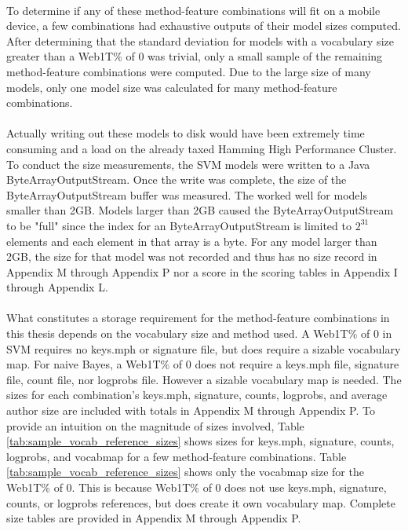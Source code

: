	\paragraph*{}To determine if any of these method-feature combinations will fit on a mobile device, a few combinations had exhaustive outputs of their model sizes computed.  After determining that the standard deviation for models with a vocabulary size greater than a Web1T\% of 0 was trivial, only a small sample of the remaining method-feature combinations were computed.  Due to the large size of many models, only one model size was calculated for many method-feature combinations.  
	\paragraph*{} Actually writing out these models to disk would have been extremely time consuming and a load on the already taxed Hamming High Performance Cluster.  To conduct the size measurements, the SVM models were written to a Java ByteArrayOutputStream.  Once the write was complete, the size of the ByteArrayOutputStream buffer was measured.  The worked well for models smaller than 2GB.  Models larger than 2GB caused the ByteArrayOutputStream to be "full" since the index for an ByteArrayOutputStream is limited to $2^{31}$ elements and each element in that array is a byte.  For any model larger than 2GB, the size for that model was not recorded and thus has no size record in Appendix M through Appendix P nor a score in the scoring tables in Appendix I through Appendix L.
	\paragraph*{} What constitutes a storage requirement for the method-feature combinations in this thesis depends on the vocabulary size and method used.  A Web1T\% of 0 in SVM requires no keys.mph or signature file, but does require a sizable vocabulary map.  For naive Bayes, a Web1T\% of 0 does not require a keys.mph file, signature file, count file, nor logprobs file.  However a sizable vocabulary map is needed.  The sizes for each combination's keys.mph, signature, counts, logprobs, and average author size are included with totals in Appendix M through Appendix P.  To provide an intuition on the magnitude of sizes involved, Table \ref{tab:sample_vocab_reference_sizes} shows sizes for keys.mph, signature, counts, logprobs, and vocabmap for a few method-feature combinations.  Table \ref{tab:sample_vocab_reference_sizes} shows only the vocabmap size for the Web1T\% of 0.  This is because Web1T\% of 0 does not use keys.mph, signature, counts, or logprobs references, but does create it own vocabulary map.  Complete size tables are provided in Appendix M through Appendix P.
	
